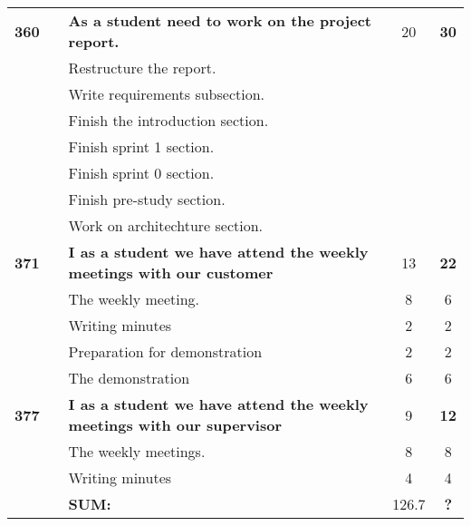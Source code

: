 \begin{longtable}{ccXcc}
\midrule
\textbf{360} 	& {M6}
	& {\bf As a student need to work on the project report.} 	& 	20	& \textbf{ 30} \\
				&& Restructure the report.	&  &  \\
				&& Write requirements subsection.	&  &  \\
				&& Finish the introduction section.	&  & \\
				&& Finish sprint 1 section.	&  &  \\
				&& Finish sprint 0 section.	&  &  \\
				&& Finish pre-study section.	&  &  \\
				&& Work on architechture section.	&  &  \\

\midrule		
\textbf{371} 	& {C1}
	& {\bf I as a student we have attend the weekly meetings with our customer} 	& 	13	& \textbf{22} \\
				&& The weekly meeting.	& 8 & 6 \\
				&& Writing minutes 	&  2 & 2 \\	
				&& Preparation for demonstration	&  2 & 2 \\
				&& The demonstration	&  6 & 6 \\

\textbf{377} 	& {C1}
	& {\bf I as a student we have attend the weekly meetings with our supervisor} 	& 	9	& \textbf{12} \\
				&& The weekly meetings.	& 8 & 8 \\
				&& Writing minutes 	&  4 & 4 \\	
				
\hline
				&& \textbf{SUM:}		&		126.7	& \textbf{?}\\																			
\bottomrule[1mm]
\end{longtable}
